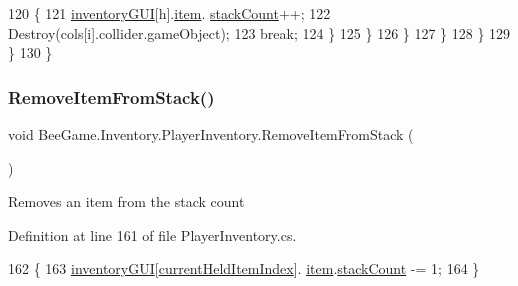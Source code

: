 \begin{DoxyCode}
120                                 \{
121                                     \hyperlink{class_bee_game_1_1_inventory_1_1_inventory_base_a48dcba7ad7bfa1bed8c9ae290fb32857}{inventoryGUI}[h].\hyperlink{class_bee_game_1_1_inventory_1_1_inventory_slot_a31b201e7eef9ed0001a447b3f76a7a81}{item}.
      \hyperlink{struct_bee_game_1_1_items_1_1_item_aaa169917b0e0f8472f20398d5d448388}{stackCount}++;
122                                     Destroy(cols[i].collider.gameObject);
123                                     \textcolor{keywordflow}{break};
124                                 \}
125                             \}
126                         \}
127                     \}
128                 \}
129             \}
130         \}
\end{DoxyCode}
\mbox{\label{class_bee_game_1_1_inventory_1_1_player_inventory_ae50a91db412070ff4e43b93c70a4e28d}} 
\subsubsection{\texorpdfstring{Remove\+Item\+From\+Stack()}{RemoveItemFromStack()}}
{\footnotesize\ttfamily void Bee\+Game.\+Inventory.\+Player\+Inventory.\+Remove\+Item\+From\+Stack (\begin{DoxyParamCaption}{ }\end{DoxyParamCaption})}



Removes an item from the stack count 



Definition at line 161 of file Player\+Inventory.\+cs.


\begin{DoxyCode}
162         \{
163             \hyperlink{class_bee_game_1_1_inventory_1_1_inventory_base_a48dcba7ad7bfa1bed8c9ae290fb32857}{inventoryGUI}[\hyperlink{class_bee_game_1_1_inventory_1_1_player_inventory_ac2978979c5c8e45fccc7d3a10882ea1b}{currentHeldItemIndex}].
      \hyperlink{class_bee_game_1_1_inventory_1_1_inventory_slot_a31b201e7eef9ed0001a447b3f76a7a81}{item}.\hyperlink{struct_bee_game_1_1_items_1_1_item_aaa169917b0e0f8472f20398d5d448388}{stackCount} -= 1;
164         \}
\end{DoxyCode}
\mbox{\label{class_bee_game_1_1_inventory_1_1_player_inventory_a226c92d8b805827199cdd1ed9796a326}} 
